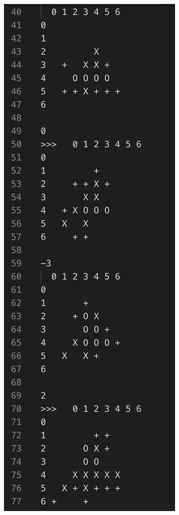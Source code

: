\documentclass[a4paper]{article}
\begin{document}
\begin{figure}[!hbt]
\begin{minipage}{0.4\textwidth}
    \centering
    \includegraphics[width=\linewidth]{assets/ode0.png}

\end{minipage}
\end{figure}
\end{document}
